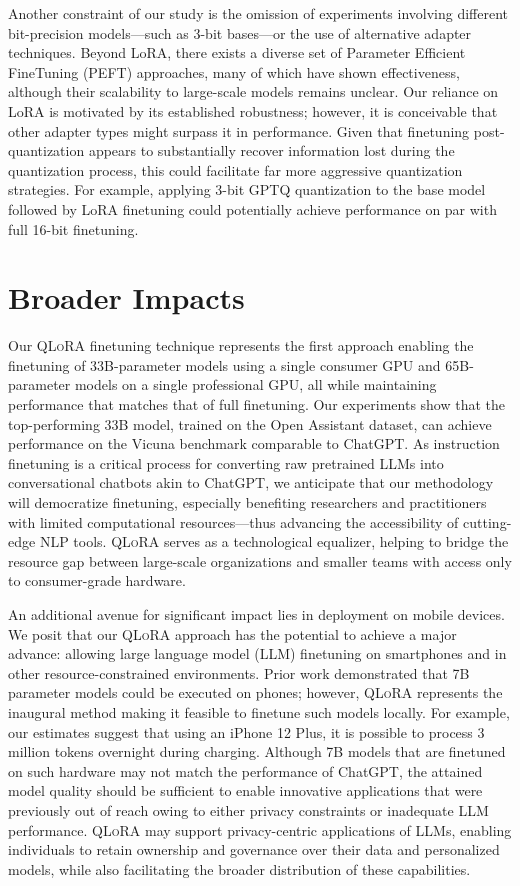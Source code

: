 Another constraint of our study is the omission of experiments involving different bit-precision models—such as 3-bit bases—or the use of alternative adapter techniques. Beyond LoRA, there exists a diverse set of Parameter Efficient FineTuning (PEFT) approaches, many of which have shown effectiveness, although their scalability to large-scale models remains unclear. Our reliance on LoRA is motivated by its established robustness; however, it is conceivable that other adapter types might surpass it in performance. Given that finetuning post-quantization appears to substantially recover information lost during the quantization process, this could facilitate far more aggressive quantization strategies. For example, applying 3-bit GPTQ quantization to the base model followed by LoRA finetuning could potentially achieve performance on par with full 16-bit finetuning.

\section{Broader Impacts}

Our \textsc{QLoRA} finetuning technique represents the first approach enabling the finetuning of 33B-parameter models using a single consumer GPU and 65B-parameter models on a single professional GPU, all while maintaining performance that matches that of full finetuning. Our experiments show that the top-performing 33B model, trained on the Open Assistant dataset, can achieve performance on the Vicuna benchmark comparable to ChatGPT. As instruction finetuning is a critical process for converting raw pretrained LLMs into conversational chatbots akin to ChatGPT, we anticipate that our methodology will democratize finetuning, especially benefiting researchers and practitioners with limited computational resources—thus advancing the accessibility of cutting-edge NLP tools. \textsc{QLoRA} serves as a technological equalizer, helping to bridge the resource gap between large-scale organizations and smaller teams with access only to consumer-grade hardware.

An additional avenue for significant impact lies in deployment on mobile devices. We posit that our \textsc{QLoRA} approach has the potential to achieve a major advance: allowing large language model (LLM) finetuning on smartphones and in other resource-constrained environments. Prior work demonstrated that 7B parameter models could be executed on phones; however, \textsc{QLoRA} represents the inaugural method making it feasible to finetune such models locally. For example, our estimates suggest that using an iPhone 12 Plus, it is possible to process 3 million tokens overnight during charging. Although 7B models that are finetuned on such hardware may not match the performance of ChatGPT, the attained model quality should be sufficient to enable innovative applications that were previously out of reach owing to either privacy constraints or inadequate LLM performance. \textsc{QLoRA} may support privacy-centric applications of LLMs, enabling individuals to retain ownership and governance over their data and personalized models, while also facilitating the broader distribution of these capabilities.

